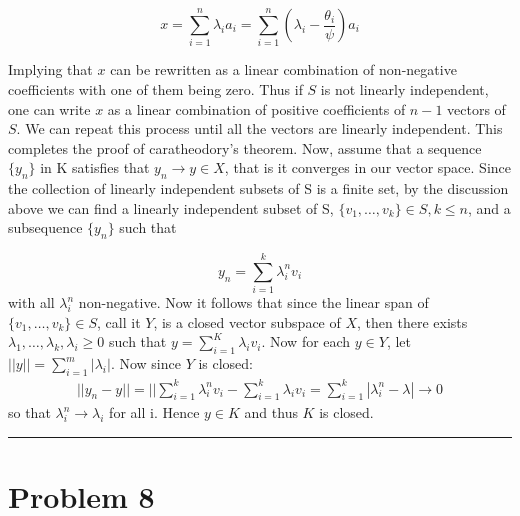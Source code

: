 \documentclass{article} %
\begin{document}
\[
x= \sum_{i=1}^{n} \lambda_i a_i = \sum_{i=1}^{n} ( \lambda_i - \frac{\theta_i}{\psi}) a_i
\]

Implying that $x$ can be rewritten as a linear combination of non-negative coefficients with one of them being zero. Thus if $S$ is not linearly independent, one can 
write $x$ as a linear combination of positive coefficients of $n-1$ vectors of $S$. We can repeat this process until all the vectors are linearly independent.  This completes the proof of caratheodory's theorem. Now, assume that a sequence $\{y_n\}$ in K satisfies that $y_n \rightarrow y \in X$, that is it converges in our vector space. Since the collection of linearly independent subsets of S is a finite set, by the discussion above we can find a linearly independent subset of S, $\{ v_1, \hdots, v_k\} \in S, k \leq n$, and a subsequence $\{y_n\}$ such that

\[
y_n = \sum_{i=1}^{k} \lambda_i^n v_i
\]
with all $\lambda_i^n$ non-negative. Now it follows that since the linear span of $\{ v_1, \hdots, v_k\} \in S$, call it $Y$,  is a closed vector subspace of $X$, then  there exists $\lambda_1, \hdots, \lambda_k, \lambda_i \geq 0$ such that $y = \sum_{i=1}^{K} \lambda_i v_i$. Now for each $y  \in Y$, let $||y|| = \sum_{i=1}^{m}|\lambda_i|$. Now since $Y$ is closed:
\begin{gather*} 
|| y_n - y|| = || \sum_{i=1}^{k} \lambda_i^n v_i - \sum_{i=1}^{k} \lambda_i v_i = \sum_{i=1}^{k} |\lambda_i^n - \lambda| \to 0
\end{gather*}  
so that $\lambda_i^n \to \lambda_i$ for all i. Hence $ y \in K$ and thus $K$ is closed. 

\rule{\textwidth}{1pt}

\section*{Problem 8}
\end{document}
